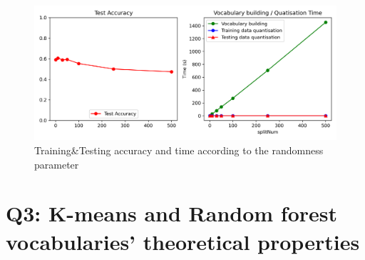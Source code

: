 \begin{figure}[htbp]
	\centering
	\includegraphics[width=0.5\linewidth]{image/q3-fig5.png}
	\caption{Training\&Testing accuracy and time according to the randomness parameter}
	\label{fig:q3-fig5}
\end{figure}

\section{Q3: K-means and Random forest vocabularies' theoretical properties}
\label{subsec:Q3-app1}
\begin{table}[htbp]
	\centering
	\setlength{\tabcolsep}{6pt} %
	\renewcommand{\arraystretch}{1.5} %
	\caption{Theoretical properties of vocabulary method: K-means and RF}
	\label{table:q3-app-1}
\end{table}

